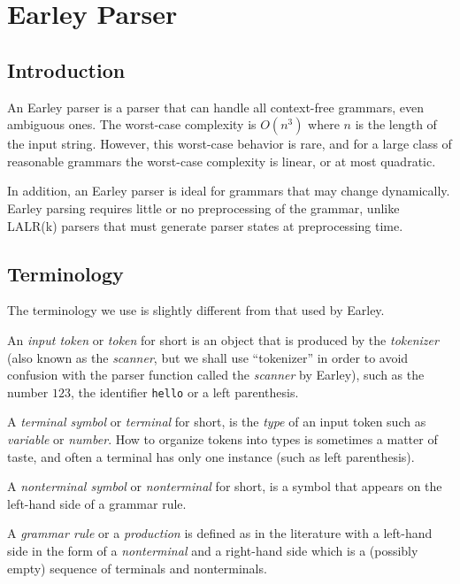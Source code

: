 \documentclass[11pt]{article}
\begin{document}
\section{Earley Parser}

\subsection{Introduction}

An Earley \cite{Earley:1983:ECP:357980.358005,
  Earley:1970:ECP:362007.362035} parser is a parser that can handle
all context-free grammars, even ambiguous ones.  The worst-case
complexity is $O(n^3)$ where $n$ is the length of the input string.
However, this worst-case behavior is rare, and for a large class of
reasonable grammars the worst-case complexity is linear, or at most
quadratic.

In addition, an Earley parser is ideal for grammars that may change
dynamically.  Earley parsing requires little or no preprocessing of
the grammar, unlike LALR(k) parsers that must generate parser states
at preprocessing time.

\subsection{Terminology}

The terminology we use is slightly different from that used by Earley.

An \emph{input token} or \emph{token} for short is an object that is
produced by the \emph{tokenizer} (also known as the \emph{scanner},
but we shall use ``tokenizer'' in order to avoid confusion with the
parser function called the \emph{scanner} by Earley), such as the
number $123$, the identifier \texttt{hello} or a left parenthesis.

A \emph{terminal symbol} or \emph{terminal} for short, is the
\emph{type} of an input token such as \emph{variable} or
\emph{number}.  How to organize tokens into types is sometimes a
matter of taste, and often a terminal has only one instance (such as
left parenthesis).  

A \emph{nonterminal symbol} or \emph{nonterminal} for short, is a
symbol that appears on the left-hand side of a grammar rule.

A \emph{grammar rule} or a \emph{production} is defined as in the
literature with a left-hand side in the form of a \emph{nonterminal}
and a right-hand side which is a (possibly empty) sequence of
terminals and nonterminals.  
\end{document}
